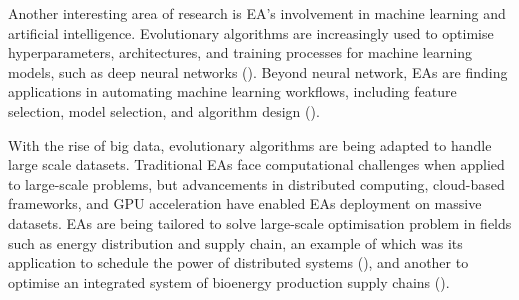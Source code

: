 \parbreak\noindent Another interesting area of research is EA's involvement in machine learning and artificial intelligence. Evolutionary algorithms are increasingly used to optimise hyperparameters, architectures, and training processes for machine learning models, such as deep neural networks (\cite{young2015optimizing}). Beyond neural network, EAs are finding applications in automating machine learning workflows, including feature selection, model selection, and algorithm design (\cite{nikitin2022automated}).

\parbreak\noindent With the rise of big data, evolutionary algorithms are being adapted to handle large scale datasets. Traditional EAs face computational challenges when applied to large-scale problems, but advancements in distributed computing, cloud-based frameworks, and GPU acceleration have enabled EAs deployment on massive datasets. EAs are being tailored to solve large-scale optimisation problem in fields such as energy distribution and supply chain, an example of which was its application to schedule the power of distributed systems (\cite{guzek2014multi}), and another to optimise an integrated system of bioenergy production supply chains (\cite{ayoub2009evolutionary}).


